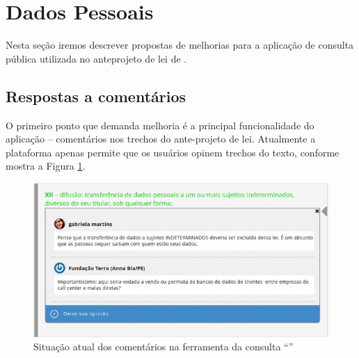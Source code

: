 \section{Dados Pessoais}
Nesta seção iremos descrever propostas de melhorias para a aplicação de consulta pública utilizada no anteprojeto de lei de \pdp.

\subsection{Respostas a comentários}
	O primeiro ponto que demanda melhoria é a principal funcionalidade do aplicação – comentários nos trechos do ante-projeto de lei.
	Atualmente a plataforma apenas permite que os usuários opinem trechos do texto, conforme mostra a Figura \ref{fig:comentarios-dados-pessoais-hoje}.
    \begin{figure}[htb]%
        \begin{center}
            \includegraphics[scale=0.6]{./imagens/dados-pessoais-atual.png}%
        \end{center}%
        \caption{Situação atual dos comentários na ferramenta da consulta ``\pdp''\label{fig:comentarios-dados-pessoais-hoje}}%
    \end{figure}%
    
